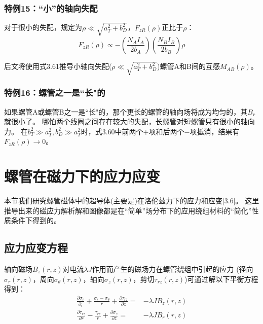 \subsubsection{特例15：``小''的轴向失配}
对于很小的失配，规定为$\rho\ll \sqrt{a_T^2+b_D^2}$，$F_{zR}(\rho)$正比于$\rho$：
\begin{equation}
F_{zR}(\rho)\propto-\left(\frac{N_AI_A}{2b_A}\right)\left(\frac{N_BI_B}{2b_B}\right)\rho
\end{equation}

后文将使用式3.61推导小轴向失配($\rho\ll \sqrt{a_T^2+b_D^2}$)螺管A和B间的互感$M_{AB}(\rho)$。

\subsubsection{特例16：螺管之一是``长"的}
如果螺管A或螺管B之一是``长"的，那个更长的螺管的轴向场将成为均匀的，其$B_r$就很小了。
哪怕两个线圈之间存在较大的失配，长螺管对短螺管只有很小的轴向力。
在$b^2_T\gg a_T^2,b_D^2\gg a_T^2$时，式3.60中前两个$+$项和后两个$-$项抵消，结果有$F_{zR}(\rho)\rightarrow 0$。

\section{螺管在磁力下的应力应变}
本节我们研究螺管磁体中的超导体(主要是)在洛伦兹力下的应力和应变[3.6]。
这里推导出来的磁应力解析解和图像都是在``简单''场分布下的应用绕组材料的``简化''性质条件下得到的。

\subsection{应力应变方程}
轴向磁场$B_z(r,z)$对电流$\lambda J$作用而产生的磁场力在螺管绕组中引起的应力
(径向$\sigma_r(r,z)$，周向$\sigma_\theta(r,z)$，轴向$\sigma_z(r,z)$，剪切$\tau_{rz}(r,z)$)可通过解以下平衡方程得到：
\begin{subequations}
	\begin{align}
\frac{\partial\sigma_{r}}{\partial_r}+\frac{\sigma_{r}-\sigma_{\theta}}{r}+\frac{\partial \tau_{rz}}{\partial z}=&-\lambda JB_z(r,z)\\
\frac{\partial \tau_{rz}}{\partial r}-\frac{\tau_{rz}}{r}+\frac{\partial \sigma_z}{\partial z}=&-\lambda JB_r(r,z)
	\end{align}
\end{subequations}


